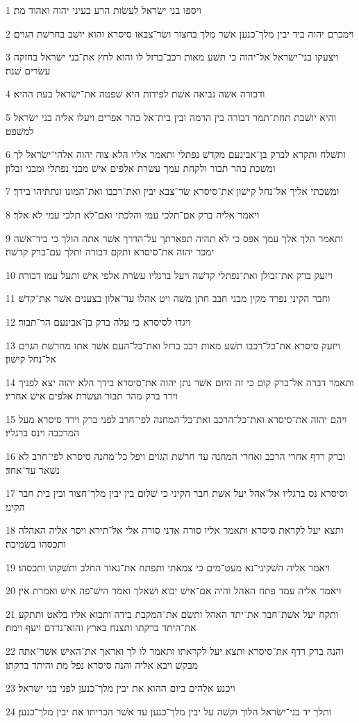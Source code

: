 \par 1 ויספו בני ישׂראל לעשׂות הרע בעיני יהוה ואהוד מת׃
\par 2 וימכרם יהוה ביד יבין מלך־כנען אשׁר מלך בחצור ושׂר־צבאו סיסרא והוא יושׁב בחרשׁת הגוים׃
\par 3 ויצעקו בני־ישׂראל אל־יהוה כי תשׁע מאות רכב־ברזל לו והוא לחץ את־בני ישׂראל בחזקה עשׂרים שׁנה׃
\par 4 ודבורה אשׁה נביאה אשׁת לפידות היא שׁפטה את־ישׂראל בעת ההיא׃
\par 5 והיא יושׁבת תחת־תמר דבורה בין הרמה ובין בית־אל בהר אפרים ויעלו אליה בני ישׂראל למשׁפט׃
\par 6 ותשׁלח ותקרא לברק בן־אבינעם מקדשׁ נפתלי ותאמר אליו הלא צוה יהוה אלהי־ישׂראל לך ומשׁכת בהר תבור ולקחת עמך עשׂרת אלפים אישׁ מבני נפתלי ומבני זבלון׃
\par 7 ומשׁכתי אליך אל־נחל קישׁון את־סיסרא שׂר־צבא יבין ואת־רכבו ואת־המונו ונתתיהו בידך׃
\par 8 ויאמר אליה ברק אם־תלכי עמי והלכתי ואם־לא תלכי עמי לא אלך׃
\par 9 ותאמר הלך אלך עמך אפס כי לא תהיה תפארתך על־הדרך אשׁר אתה הולך כי ביד־אשׁה ימכר יהוה את־סיסרא ותקם דבורה ותלך עם־ברק קדשׁה׃
\par 10 ויזעק ברק את־זבולן ואת־נפתלי קדשׁה ויעל ברגליו עשׂרת אלפי אישׁ ותעל עמו דבורה׃
\par 11 וחבר הקיני נפרד מקין מבני חבב חתן משׁה ויט אהלו עד־אלון בצענים אשׁר את־קדשׁ׃
\par 12 ויגדו לסיסרא כי עלה ברק בן־אבינעם הר־תבור׃
\par 13 ויזעק סיסרא את־כל־רכבו תשׁע מאות רכב ברזל ואת־כל־העם אשׁר אתו מחרשׁת הגוים אל־נחל קישׁון׃
\par 14 ותאמר דברה אל־ברק קום כי זה היום אשׁר נתן יהוה את־סיסרא בידך הלא יהוה יצא לפניך וירד ברק מהר תבור ועשׂרת אלפים אישׁ אחריו׃
\par 15 ויהם יהוה את־סיסרא ואת־כל־הרכב ואת־כל־המחנה לפי־חרב לפני ברק וירד סיסרא מעל המרכבה וינס ברגליו׃
\par 16 וברק רדף אחרי הרכב ואחרי המחנה עד חרשׁת הגוים ויפל כל־מחנה סיסרא לפי־חרב לא נשׁאר עד־אחד׃
\par 17 וסיסרא נס ברגליו אל־אהל יעל אשׁת חבר הקיני כי שׁלום בין יבין מלך־חצור ובין בית חבר הקיני׃
\par 18 ותצא יעל לקראת סיסרא ותאמר אליו סורה אדני סורה אלי אל־תירא ויסר אליה האהלה ותכסהו בשׂמיכה׃
\par 19 ויאמר אליה השׁקיני־נא מעט־מים כי צמאתי ותפתח את־נאוד החלב ותשׁקהו ותכסהו׃
\par 20 ויאמר אליה עמד פתח האהל והיה אם־אישׁ יבוא ושׁאלך ואמר הישׁ־פה אישׁ ואמרת אין׃
\par 21 ותקח יעל אשׁת־חבר את־יתד האהל ותשׂם את־המקבת בידה ותבוא אליו בלאט ותתקע את־היתד ברקתו ותצנח בארץ והוא־נרדם ויעף וימת׃
\par 22 והנה ברק רדף את־סיסרא ותצא יעל לקראתו ותאמר לו לך ואראך את־האישׁ אשׁר־אתה מבקשׁ ויבא אליה והנה סיסרא נפל מת והיתד ברקתו׃
\par 23 ויכנע אלהים ביום ההוא את יבין מלך־כנען לפני בני ישׂראל׃
\par 24 ותלך יד בני־ישׂראל הלוך וקשׁה על יבין מלך־כנען עד אשׁר הכריתו את יבין מלך־כנען׃

